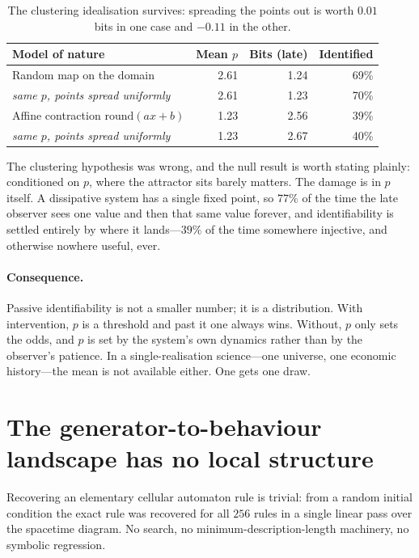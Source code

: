 \documentclass[11pt]{article}
\begin{document}
\begin{table}[h]
\centering
\begin{tabular}{lrrr}
\toprule
Model of nature & Mean $p$ & Bits (late) & Identified \\
\midrule
Random map on the domain & 2.61 & 1.24 & 69\% \\
\quad \emph{same $p$, points spread uniformly} & 2.61 & 1.23 & 70\% \\
Affine contraction $\mathrm{round}(ax+b)$ & 1.23 & 2.56 & 39\% \\
\quad \emph{same $p$, points spread uniformly} & 1.23 & 2.67 & 40\% \\
\bottomrule
\end{tabular}
\caption{The clustering idealisation survives: spreading the points out is worth $0.01$
bits in one case and $-0.11$ in the other.}
\end{table}

The clustering hypothesis was wrong, and the null result is worth stating plainly:
conditioned on $p$, where the attractor sits barely matters. The damage is in $p$
itself. A dissipative system has a single fixed point, so $77\%$ of the time the late
observer sees one value and then that same value forever, and identifiability is
settled entirely by where it lands---$39\%$ of the time somewhere injective, and
otherwise nowhere useful, ever.

\paragraph{Consequence.} Passive identifiability is not a smaller number; it is a
distribution. With intervention, $p$ is a threshold and past it one always wins.
Without, $p$ only sets the odds, and $p$ is set by the system's own dynamics rather
than by the observer's patience. In a single-realisation science---one universe, one
economic history---the mean is not available either. One gets one draw.

\section{The generator-to-behaviour landscape has no local structure}\label{sec:landscape}

Recovering an elementary cellular automaton rule is trivial: from a random initial
condition the exact rule was recovered for all $256$ rules in a single linear pass over
the spacetime diagram. No search, no minimum-description-length machinery, no symbolic
regression.
\end{document}
